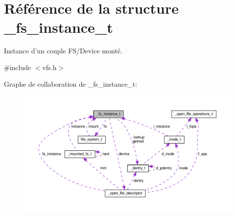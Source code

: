 \hypertarget{struct__fs__instance__t}{\section{Référence de la structure \+\_\+fs\+\_\+instance\+\_\+t}
\label{struct__fs__instance__t}
}


Instance d'un couple F\+S/\+Device monté.  




{\ttfamily \#include $<$vfs.\+h$>$}



Graphe de collaboration de \+\_\+fs\+\_\+instance\+\_\+t\+:
\nopagebreak
\begin{figure}[H]
\begin{center}
\leavevmode
\includegraphics[width=350pt]{struct__fs__instance__t__coll__graph}
\end{center}
\end{figure}
